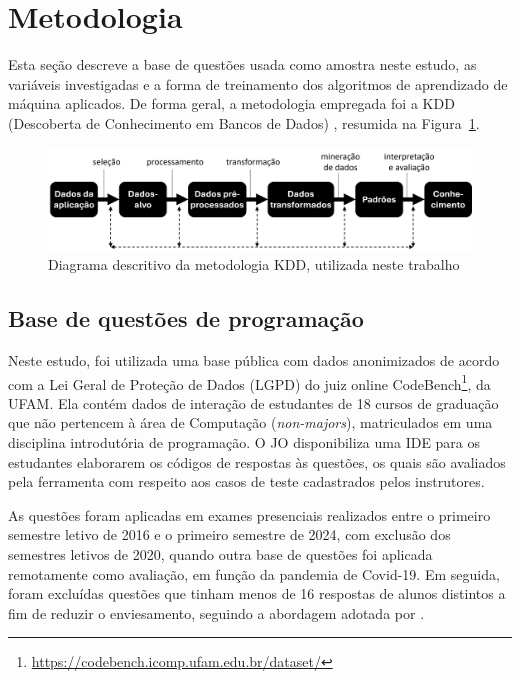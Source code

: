 \documentclass[12pt]{article}
\begin{document}
\section{Metodologia} \label{sec:metod}

Esta seção descreve a base de questões usada como amostra neste estudo, as variáveis investigadas e a forma de treinamento dos algoritmos de aprendizado de máquina aplicados. De forma geral, a metodologia empregada foi a KDD (Descoberta de Conhecimento em Bancos de Dados) \cite{fayyad1996}, resumida na Figura~\ref{fig:kdd}.

\begin{figure}[H]
    \centering
    \includegraphics[width=.95\textwidth]{Figures/kdd3.jpg}
    \caption{Diagrama descritivo da metodologia KDD, utilizada neste trabalho}
    \label{fig:kdd}
\end{figure}

\subsection{Base de questões de programação} %

Neste estudo, foi utilizada uma base pública com dados anonimizados de acordo com a Lei Geral de Proteção de Dados (LGPD) do juiz online CodeBench\footnote{\url{https://codebench.icomp.ufam.edu.br/dataset/}}, da UFAM. Ela contém dados de interação de estudantes de 18 cursos de graduação que não pertencem à área de Computação (\textit{non-majors}), matriculados em uma disciplina introdutória de programação. O JO disponibiliza uma IDE para os estudantes elaborarem os códigos de respostas às questões, os quais são avaliados pela ferramenta com respeito aos casos de teste cadastrados pelos instrutores.

As questões foram aplicadas em exames presenciais realizados entre o primeiro semestre letivo de 2016 e o primeiro semestre de 2024, com exclusão dos semestres letivos de 2020, quando outra base de questões foi  aplicada remotamente como avaliação, em função da pandemia de Covid-19. Em seguida, foram excluídas questões que tinham menos de 16 respostas de alunos distintos a fim de reduzir o enviesamento, seguindo a abordagem adotada por \cite{marcos2021}.
\end{document}
